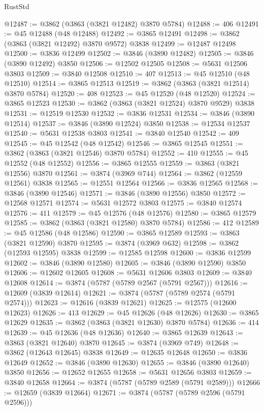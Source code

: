 \begin{lexlean}{RustStd}
\begin{coremodule}
@12487 := @3862 (@3863 (@3821 @12482) @3870 @5784)
@12488 := 406
@12491 := @45 @12488 (@48 @12488)
@12492 := @3865 @12491
@12498 := @3862 (@3863 (@3821 @12492) @3870 @9572) @3838
@12499 := @12487 @12498
@12500 := @3836 @12499
@12502 := @3846 (@3890 @12482)
@12505 := @3846 (@3890 @12492) @3850
@12506 := @12502 @12505
@12508 := @5631 @12506 @3803
@12509 := @3840 @12508
@12510 := 407
@12513 := @45 @12510 (@48 @12510)
@12514 := @3865 @12513
@12519 := @3862 (@3863 (@3821 @12514) @3870 @5784)
@12520 := 408
@12523 := @45 @12520 (@48 @12520)
@12524 := @3865 @12523
@12530 := @3862 (@3863 (@3821 @12524) @3870 @9529) @3838
@12531 := @12519 @12530
@12532 := @3836 @12531
@12534 := @3846 (@3890 @12514)
@12537 := @3846 (@3890 @12524) @3850
@12538 := @12534 @12537
@12540 := @5631 @12538 @3803
@12541 := @3840 @12540
@12542 := 409
@12545 := @45 @12542 (@48 @12542)
@12546 := @3865 @12545
@12551 := @3862 (@3863 (@3821 @12546) @3870 @5784)
@12552 := 410
@12555 := @45 @12552 (@48 @12552)
@12556 := @3865 @12555
@12559 := @3863 (@3821 @12556) @3870
@12561 := @3874 (@3969 @744)
@12564 := @3862 (@12559 @12561) @3838
@12565 := @12551 @12564
@12566 := @3836 @12565
@12568 := @3846 (@3890 @12546)
@12571 := @3846 (@3890 @12556) @3850
@12572 := @12568 @12571
@12574 := @5631 @12572 @3803
@12575 := @3840 @12574
@12576 := 411
@12579 := @45 @12576 (@48 @12576)
@12580 := @3865 @12579
@12585 := @3862 (@3863 (@3821 @12580) @3870 @5784)
@12586 := 412
@12589 := @45 @12586 (@48 @12586)
@12590 := @3865 @12589
@12593 := @3863 (@3821 @12590) @3870
@12595 := @3874 (@3969 @632)
@12598 := @3862 (@12593 @12595) @3838
@12599 := @12585 @12598
@12600 := @3836 @12599
@12602 := @3846 (@3890 @12580)
@12605 := @3846 (@3890 @12590) @3850
@12606 := @12602 @12605
@12608 := @5631 @12606 @3803
@12609 := @3840 @12608
@12614 := @3874 (@5787 (@5789 @2567 (@5791 @2567)))
@12616 := @12609 (@3839 @12614)
@12621 := @3874 (@5787 (@5789 @2574 (@5791 @2574)))
@12623 := @12616 (@3839 @12621)
@12625 := @12575 (@12600 @12623)
@12626 := 413
@12629 := @45 @12626 (@48 @12626)
@12630 := @3865 @12629
@12635 := @3862 (@3863 (@3821 @12630) @3870 @5784)
@12636 := 414
@12639 := @45 @12636 (@48 @12636)
@12640 := @3865 @12639
@12643 := @3863 (@3821 @12640) @3870
@12645 := @3874 (@3969 @749)
@12648 := @3862 (@12643 @12645) @3838
@12649 := @12635 @12648
@12650 := @3836 @12649
@12652 := @3846 (@3890 @12630)
@12655 := @3846 (@3890 @12640) @3850
@12656 := @12652 @12655
@12658 := @5631 @12656 @3803
@12659 := @3840 @12658
@12664 := @3874 (@5787 (@5789 @2589 (@5791 @2589)))
@12666 := @12659 (@3839 @12664)
@12671 := @3874 (@5787 (@5789 @2596 (@5791 @2596)))

\end{coremodule}
\end{lexlean}
